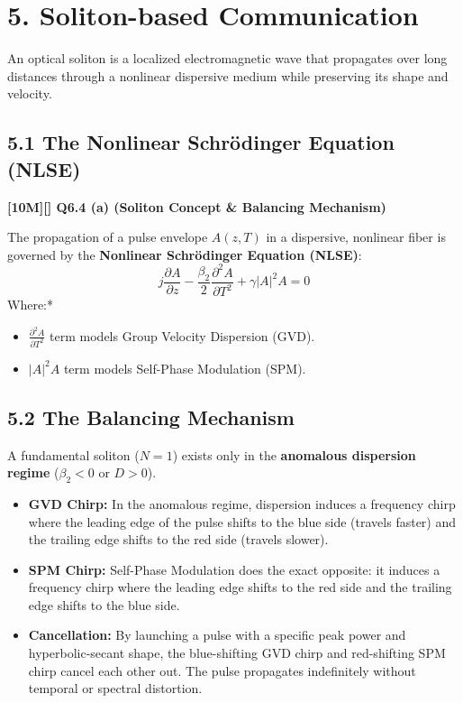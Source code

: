 \section{5. Soliton-based Communication}

An optical soliton is a localized electromagnetic wave that propagates over long distances through a nonlinear dispersive medium while preserving its shape and velocity.

\subsection{5.1 The Nonlinear Schrödinger Equation (NLSE)}
\textbf{[10M][] Q6.4 (a) (Soliton Concept \& Balancing Mechanism)}

The propagation of a pulse envelope $A(z,T)$ in a dispersive, nonlinear fiber is governed by the \textbf{Nonlinear Schrödinger Equation (NLSE)}:
\[ j \frac{\partial A}{\partial z} - \frac{\beta_2}{2} \frac{\partial^2 A}{\partial T^2} + \gamma |A|^2 A = 0 \]
\textit{   }Where:*
\begin{itemize}
  \item   $\frac{\partial^2 A}{\partial T^2}$ term models Group Velocity Dispersion (GVD).
  \item   $|A|^2 A$ term models Self-Phase Modulation (SPM).
\end{itemize}


\subsection{5.2 The Balancing Mechanism}
A fundamental soliton ($N=1$) exists only in the \textbf{anomalous dispersion regime} ($\beta_2 < 0$ or $D > 0$).
\begin{itemize}
  \item   \textbf{GVD Chirp:} In the anomalous regime, dispersion induces a frequency chirp where the leading edge of the pulse shifts to the blue side (travels faster) and the trailing edge shifts to the red side (travels slower).
  \item   \textbf{SPM Chirp:} Self-Phase Modulation does the exact opposite: it induces a frequency chirp where the leading edge shifts to the red side and the trailing edge shifts to the blue side.
  \item   \textbf{Cancellation:} By launching a pulse with a specific peak power and hyperbolic-secant shape, the blue-shifting GVD chirp and red-shifting SPM chirp cancel each other out. The pulse propagates indefinitely without temporal or spectral distortion.
\end{itemize}

